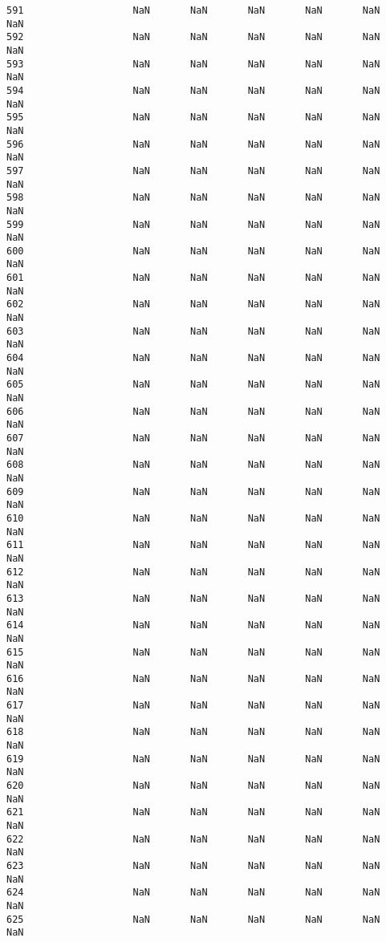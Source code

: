 \documentclass[11pt]{article}
\begin{document}
\begin{Verbatim}[commandchars=\\\{\}]
591                   NaN       NaN       NaN       NaN       NaN       NaN
592                   NaN       NaN       NaN       NaN       NaN       NaN
593                   NaN       NaN       NaN       NaN       NaN       NaN
594                   NaN       NaN       NaN       NaN       NaN       NaN
595                   NaN       NaN       NaN       NaN       NaN       NaN
596                   NaN       NaN       NaN       NaN       NaN       NaN
597                   NaN       NaN       NaN       NaN       NaN       NaN
598                   NaN       NaN       NaN       NaN       NaN       NaN
599                   NaN       NaN       NaN       NaN       NaN       NaN
600                   NaN       NaN       NaN       NaN       NaN       NaN
601                   NaN       NaN       NaN       NaN       NaN       NaN
602                   NaN       NaN       NaN       NaN       NaN       NaN
603                   NaN       NaN       NaN       NaN       NaN       NaN
604                   NaN       NaN       NaN       NaN       NaN       NaN
605                   NaN       NaN       NaN       NaN       NaN       NaN
606                   NaN       NaN       NaN       NaN       NaN       NaN
607                   NaN       NaN       NaN       NaN       NaN       NaN
608                   NaN       NaN       NaN       NaN       NaN       NaN
609                   NaN       NaN       NaN       NaN       NaN       NaN
610                   NaN       NaN       NaN       NaN       NaN       NaN
611                   NaN       NaN       NaN       NaN       NaN       NaN
612                   NaN       NaN       NaN       NaN       NaN       NaN
613                   NaN       NaN       NaN       NaN       NaN       NaN
614                   NaN       NaN       NaN       NaN       NaN       NaN
615                   NaN       NaN       NaN       NaN       NaN       NaN
616                   NaN       NaN       NaN       NaN       NaN       NaN
617                   NaN       NaN       NaN       NaN       NaN       NaN
618                   NaN       NaN       NaN       NaN       NaN       NaN
619                   NaN       NaN       NaN       NaN       NaN       NaN
620                   NaN       NaN       NaN       NaN       NaN       NaN
621                   NaN       NaN       NaN       NaN       NaN       NaN
622                   NaN       NaN       NaN       NaN       NaN       NaN
623                   NaN       NaN       NaN       NaN       NaN       NaN
624                   NaN       NaN       NaN       NaN       NaN       NaN
625                   NaN       NaN       NaN       NaN       NaN       NaN

\end{Verbatim}
\end{document}
